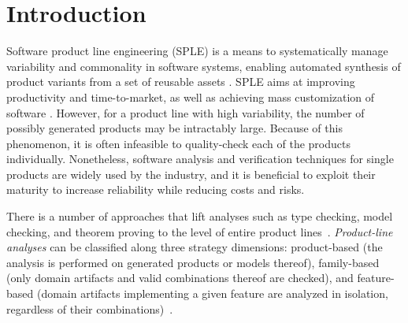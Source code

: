 \section{Introduction}
\label{sec:introduction}

Software product line engineering (SPLE) is a means to systematically
manage variability and commonality in software systems, enabling automated
synthesis of product variants from a set of reusable assets
\citep{ClementsSPL2001, PohlSPLE, FOSPL}.
SPLE aims at improving productivity and time-to-market, as well as
achieving mass customization of software \citep{PohlSPLE}.
However, for a product line with high variability, the number of possibly generated products may be intractably large. Because of
this phenomenon, it is often infeasible to quality-check each of the products individually. 
Nonetheless, software analysis and verification techniques for single products are widely used by the industry, and it is beneficial to exploit their maturity to increase reliability while reducing costs and risks.


There is a number of approaches that lift analyses such as type checking, model checking, and theorem proving 
to the level of entire product lines~\cite{Thum2014}. 
\textit{Product-line analyses} can be classified along three strategy dimensions:
product-based (the analysis is performed on generated products or models thereof),
family-based (only domain artifacts and valid combinations thereof are checked),
and feature-based (domain artifacts implementing a given feature are analyzed in isolation,
regardless of their combinations)~\cite{Thum2014}.

